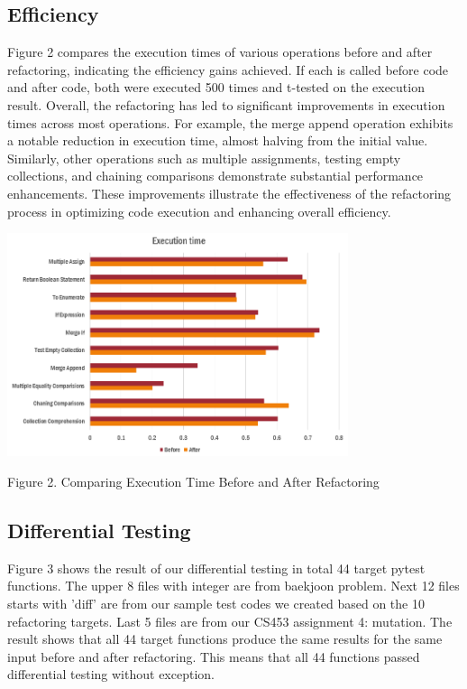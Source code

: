 \documentclass[11pt]{article}
\begin{document}
\subsection{Efficiency}

Figure 2 compares the execution times of various operations before and after refactoring, indicating the efficiency gains achieved. If each is called before code and after code, both were executed 500 times and t-tested on the execution result. Overall, the refactoring has led to significant improvements in execution times across most operations. For example, the merge append operation exhibits a notable reduction in execution time, almost halving from the initial value. Similarly, other operations such as multiple assignments, testing empty collections, and chaining comparisons demonstrate substantial performance enhancements. These improvements illustrate the effectiveness of the refactoring process in optimizing code execution and enhancing overall efficiency.

\begin{center}
\includegraphics[width = 10cm]{images/Evaluation.PNG}

{Figure 2. Comparing Execution Time Before and After Refactoring}
\end{center}

\subsection{Differential Testing}

Figure 3 shows the result of our differential testing in total 44 target pytest functions. The upper 8 files with integer are from baekjoon problem. Next 12 files starts with 'diff' are from our sample test codes we created based on the 10 refactoring targets. Last 5 files are from our CS453 assignment 4: mutation. The result shows that all 44 target functions produce the same results for the same input before and after refactoring. This means that all 44 functions passed differential testing without exception.
\end{document}
